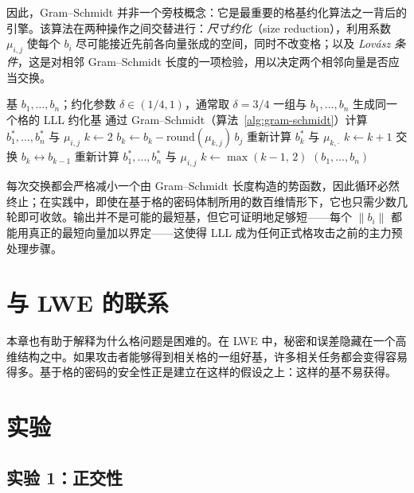 因此，Gram--Schmidt 并非一个旁枝概念：它是最重要的格基约化算法之一背后的引擎。该算法在两种操作之间交替进行：\emph{尺寸约化}（size reduction），利用系数 $\mu_{i,j}$ 使每个 $b_i$ 尽可能接近先前各向量张成的空间，同时不改变格；以及 \emph{Lov\'asz 条件}，这是对相邻 Gram--Schmidt 长度的一项检验，用以决定两个相邻向量是否应当交换。

\begin{algorithm}[H]
\caption{LLL 格基约化}
\label{alg:lll}
\begin{algorithmic}[1]
\Require 基 $b_1,\dots,b_n$；约化参数 $\delta \in (1/4,1)$，通常取 $\delta = 3/4$
\Ensure 一组与 $b_1,\dots,b_n$ 生成同一个格的 LLL 约化基
\State 通过 Gram--Schmidt（算法~\ref{alg:gram-schmidt}）计算 $b_1^*,\dots,b_n^*$ 与 $\mu_{i,j}$
\State $k \gets 2$
     
            \State $b_k \gets b_k - \mathrm{round}(\mu_{k,j})\, b_j$
            \State 重新计算 $b_k^*$ 与 $\mu_{k,\cdot}$
        \EndIf
    \EndFor
     
        \State $k \gets k+1$
    \Else
        \State 交换 $b_k \leftrightarrow b_{k-1}$
        \State 重新计算 $b_1^*,\dots,b_n^*$ 与 $\mu_{i,j}$
        \State $k \gets \max(k-1,\,2)$
    \EndIf
\EndWhile
\State \Return $(b_1,\dots,b_n)$
\end{algorithmic}
\end{algorithm}

每次交换都会严格减小一个由 Gram--Schmidt 长度构造的势函数，因此循环必然终止；在实践中，即使在基于格的密码体制所用的数百维情形下，它也只需少数几轮即可收敛。输出并不是可能的最短基，但它可证明地足够短——每个 $\|b_i\|$ 都能用真正的最短向量加以界定——这使得 LLL 成为任何正式格攻击之前的主力预处理步骤。

\section{与 LWE 的联系}
本章也有助于解释为什么格问题是困难的。在 LWE 中，秘密和误差隐藏在一个高维结构之中。如果攻击者能够得到相关格的一组好基，许多相关任务都会变得容易得多。基于格的密码的安全性正是建立在这样的假设之上：这样的基不易获得。

\section{实验}

\subsection{实验 1：正交性}

